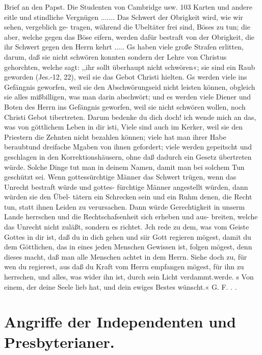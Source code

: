 Brief an den Papst. Die Studenten von Cambridge usw. 103
Karten und andere eitle und stindliche Vergnügen .......
Das Schwert der Obrigkeit wird, wie wir sehen, vergeblich ge-
tragen, während die Ubeltäter frei sind, Böses zu tun; die aber,
welche gegen das Böse eifern, werden dafür bestraft von der
Obrigkeit, die ihr Schwert gegen den Herrn kehrt ..... Gs haben
viele große Strafen erlitten, darum, daß sie nicht schwören konnten
sondern der Lehre von Christus gehorchten, welche sagt: ,,ihr sollt
überhaupt nicht schwören«; sie sind ein Raub geworden (Jes.-12, 22),
weil sie das Gebot Christi hielten. Gs werden viele ins Gefängnis
geworfen, weil sie den Abschwörungseid nicht leisten können, obgleich
sie alles mißbilligen, was man darin abschwört; und es werden
viele Diener und Boten des Herrn ins Gefängnis geworfen, weil sie
nicht schwören wollen, noch Christi Gebot tibertreten. Darum bedenke
du dich doch! ich wende mich an das, was von göttlichem Leben
in dir isti, Viele sind auch im Kerker, weil sie den Priestern die
Zehnten nicht bezahlen können; viele hat man ihrer Habe beraubtund
dreifache Mgaben von ihnen gefordert; viele werden gepeitscht und
geschlagen in den Korrektionshäusern, ohne daß dadurch ein Gesetz
übertreten würde. Solche Dinge tut man in deinem Namen, damit
man bei solchem Tun geschützt sei. Wenn gottessürchtige Männer
das Schwert trügen, wenn das Unrecht bestraft würde und gottes-
fürchtige Männer angestellt würden, dann würden sie den Übel-
tätern ein Schrecken sein und ein Ruhm denen, die Recht tun, statt
ihnen Leiden zu verursachen. Dann würde Gerechtigkeit in unserm
Lande herrschen und die Rechtschafsenheit sich erheben und aus-
breiten, welche das Unrecht nicht zuläßt, sondern es richtet. Jch
rede zu dem, was vom Geiste Gottes in dir ist, daß du in dich
gehen und siir Gott regieren mögest, damit du dem Göttlichen,
das in eines jeden Menschen Gewissen ist, folgen mögest, denn
dieses macht, daß man alle Menschen achtet in dem Herrn. Siehe
doch zu, für wen du regierest, aus daß du Kraft vom Herrn
empfangen mögest, für ihn zu herrschen, und alles, was wider ihn
ist, durch sein Licht verdammt.werde.
s Von einem, der deine Seele lieb hat, und dein ewiges Bestes
wünscht.« G. F. . .




\chapter[Angriffe der Independenten und Presbyterianer.]{Angriffe der Independenten und Presbyterianer.}


